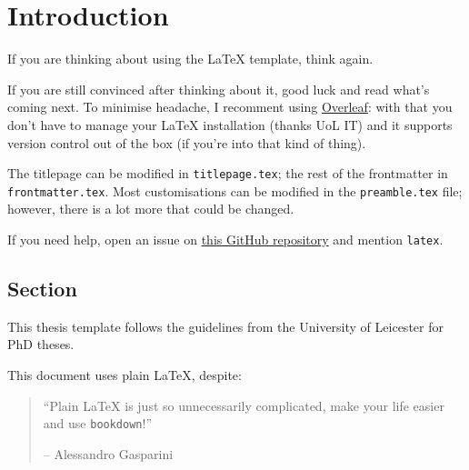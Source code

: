 
\chapter{Introduction}\label{intro}

If you are thinking about using the \LaTeX\xspace template, think again.

If you are still convinced after thinking about it, good luck and read what's coming next.
To minimise headache, I recomment using \href{https://www.overleaf.com/}{Overleaf}: with that you don't have to manage your \LaTeX\xspace installation (thanks UoL IT) and it supports version control out of the box (if you're into that kind of thing).

The titlepage can be modified in \texttt{titlepage.tex}; the rest of the frontmatter in \texttt{frontmatter.tex}.
Most customisations can be modified in the \texttt{preamble.tex} file; however, there is a lot more that could be changed.

If you need help, open an issue on \href{https://github.com/ellessenne/uol-thesis}{this GitHub repository} and mention \texttt{latex}.

\section{Section}\label{intro-section}

This thesis template follows the guidelines from the University of Leicester for PhD theses.

This document uses plain \LaTeX, despite:

\begin{quote}
``Plain \LaTeX\xspace is just so unnecessarily complicated, make your life easier and use \texttt{bookdown}!''

-- Alessandro Gasparini
\end{quote}
